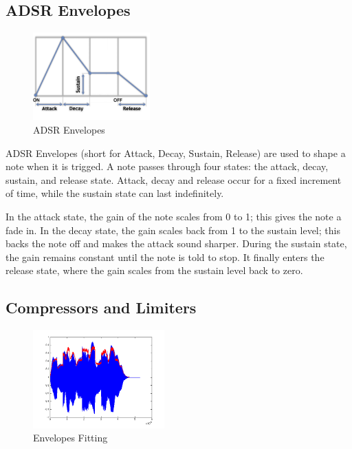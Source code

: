 \documentclass[letterpaper,12pt]{article}
\begin{document}
\subsection{ADSR Envelopes}

\begin{figure}
\centering
\includegraphics[width=0.4\textwidth]{figures/adsr.png}
\caption{ADSR Envelopes}
\label{fig:adsr}
\end{figure}

ADSR Envelopes (short for Attack, Decay, Sustain, Release) are used to shape a note when it is trigged. A note passes through four states: the attack, decay, sustain, and release state. Attack, decay and release occur for a fixed increment of time, while the sustain state can last indefinitely.

In the attack state, the gain of the note scales from 0 to 1; this gives the note a fade in. In the decay state, the gain scales back from 1 to the sustain level; this backs the note off and makes the attack sound sharper. During the sustain state, the gain remains constant until the note is told to stop. It finally enters the release state, where the gain scales from the sustain level back to zero.


\subsection{Compressors and Limiters}

\begin{figure}
\centering
\includegraphics[width=0.45\textwidth]{figures/envelope-fit.png}
\caption{Envelopes Fitting}
\label{fig:envelopes}
\end{figure}
\end{document}
